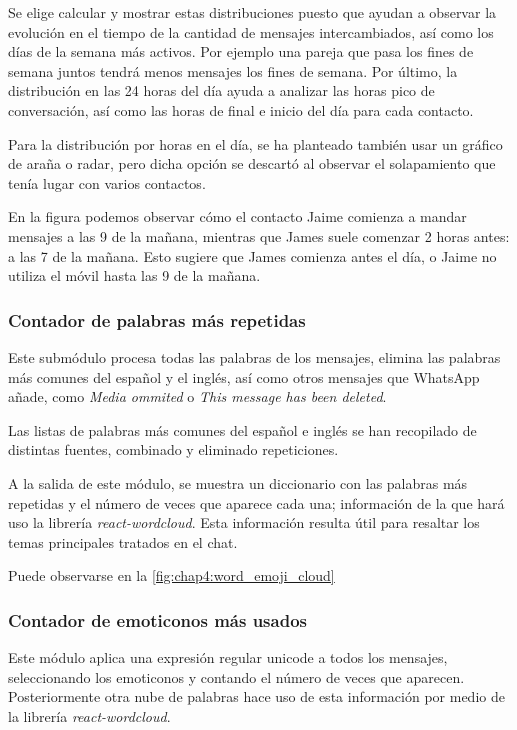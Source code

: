 Se elige calcular y mostrar estas distribuciones puesto que ayudan a observar la evolución en el tiempo de la cantidad de mensajes intercambiados, así como los días de la semana más activos. Por ejemplo una pareja que pasa los fines de semana juntos tendrá menos mensajes los fines de semana. Por último, la distribución en las 24 horas del día ayuda a analizar las horas pico de conversación, así como las horas de final e inicio del día para cada contacto.

Para la distribución por horas en el día, se ha planteado también usar un gráfico de araña o radar, pero dicha opción se descartó al observar el solapamiento que tenía lugar con varios contactos.

En la figura podemos observar cómo el contacto Jaime comienza a mandar mensajes a las 9 de la mañana, mientras que James suele comenzar 2 horas antes: a las 7 de la mañana. Esto sugiere que James comienza antes el día, o Jaime no utiliza el móvil hasta las 9 de la mañana.

\subsubsection{Contador de palabras más repetidas}

Este submódulo procesa todas las palabras de los mensajes, elimina las palabras más comunes del español y el inglés, así como otros mensajes que WhatsApp añade, como \textit{Media ommited} o \textit{This message has been deleted}.

Las listas de palabras más comunes del español e inglés se han recopilado de distintas fuentes, combinado y eliminado repeticiones.

A la salida de este módulo, se muestra un diccionario con las palabras más repetidas y el número de veces que aparece cada una; información de la que hará uso la librería \textit{react-wordcloud}. Esta información resulta útil para resaltar los temas principales tratados en el chat.

Puede observarse en la \autoref{fig:chap4:word_emoji_cloud}

\subsubsection{Contador de emoticonos más usados}

Este módulo aplica una expresión regular unicode a todos los mensajes, seleccionando los emoticonos y contando el número de veces que aparecen. Posteriormente otra nube de palabras hace uso de esta información por medio de la librería \textit{react-wordcloud}.

